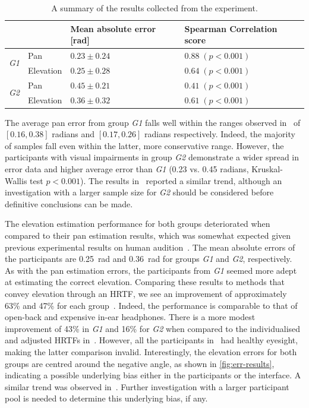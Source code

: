 \documentclass{llncs}
\begin{document}
\begin{table}
  \centering
  \caption{A summary of the results collected from the experiment. }\label{tab:results}
  \begin{tabular}{p{1cm}p{2cm}p{2.2cm}@{\hskip 1cm}p{3.2cm}}
    \toprule
    &           & Mean absolute error [rad]  & Spearman Correlation score \\ \midrule
    \multirow{2}{*}{\textit{G1}} & Pan       & $0.23\pm0.24$ & $0.88\;(p<0.001)$ \\
				 & Elevation & $0.25\pm0.28$ & $0.64\;(p<0.001)$ \\ \midrule
    \multirow{2}{*}{\textit{G2}} & Pan       & $0.45\pm0.21$ & $0.41\;(p<0.001)$ \\
				 & Elevation & $0.36\pm0.32$ & $0.61\;(p<0.001)$ \\
    \bottomrule
  \end{tabular}
\end{table}

The average pan error from group \textit{G1} falls well within the ranges observed in~\cite{macdonald2006spatial,schonstein2008comparison} of $[0.16, 0.38]$ radians and $[0.17, 0.26]$ radians respectively. 
Indeed, the majority of samples fall even within the latter, more conservative range. 
However, the participants with visual impairments in group \textit{G2}  demonstrate a wider spread in error data and higher average error than \textit{G1} (0.23 vs. 0.45 radians, Kruskal-Wallis test $p<0.001$). 
The results in~\cite{katz2011spatial,zwiers2001spatial} reported a similar trend, although an investigation with a larger sample size for \textit{G2} should be considered before definitive conclusions can be made.

The elevation estimation performance for both groups deteriorated when compared to their pan estimation results, which was somewhat expected given previous experimental results on human audition~\cite{barfield1997visual}. 
The mean absolute errors of the participants are \SI{0.25}{\radian} and \SI{0.36}{\radian} for groups \textit{G1} and \textit{G2}, respectively.
As with the pan estimation errors, the participants from \textit{G1} seemed more adept at estimating the correct elevation.
Comparing these results to methods that convey elevation through an HRTF, we see an improvement of approximately 63\% and 47\% for each group~\cite{schonstein2008comparison}. 
Indeed, the performance is comparable to that of open-back and expensive in-ear headphones.
There is a more modest improvement of 43\% in \textit{G1} and 16\% for \textit{G2} when compared to the individualised and adjusted HRTFs in~\cite{stanley2006lateralization}.
However, all the participants in~\cite{stanley2006lateralization} had healthy eyesight, making the latter comparison invalid. 
Interestingly, the elevation errors for both groups are centred around the negative angle, as shown in \cref{fig:err-results}, indicating a possible underlying bias either in the participants or the interface.
A similar trend was observed in~\cite{stanley2006lateralization}. Further investigation with a larger participant pool is needed to determine this underlying bias, if any. 
\end{document}
